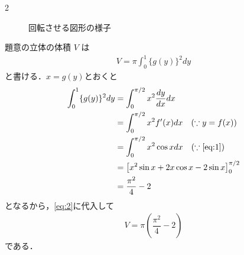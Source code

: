 \documentclass[../../main.tex]{subfiles}
\begin{document}
\begin{multicols}{2}
\begin{figure}[H]
    \caption{回転させる図形の様子}
    \label{1999-6:fig:1}
  \end{figure}

  題意の立体の体積 $V$ は
  \begin{align}
    V = \pi \int_{0}^{1} \{g(y)\}^2 dy \label{eq:2}
  \end{align}
  と書ける．$x=g(y)$とおくと
  \begin{align}
    \int_{0}^{1} \{g(y)\}^2 dy
    & = \int_{0}^{\pi/2} x^2 \dfrac{dy}{dx} dx                              \\
    & = \int_{0}^{\pi/2} x^2 f'(x) dx \quad (\because y=f(x))              \\
    & = \int_{0}^{\pi/2} x^2 \cos x dx \quad (\because\text{\cref{eq:1}}) \\
    & = \left[ x^2 \sin x + 2x \cos x - 2\sin x \right]_{0}^{\pi/2}        \\
    & = \dfrac{\pi^2}{4} - 2
  \end{align}
  となるから，\cref{eq:2}に代入して
  \begin{align}
    V = \pi \left(\dfrac{\pi^2}{4} - 2\right) \label{eq:3}
  \end{align}
  である．


\end{multicols}
\end{document}
